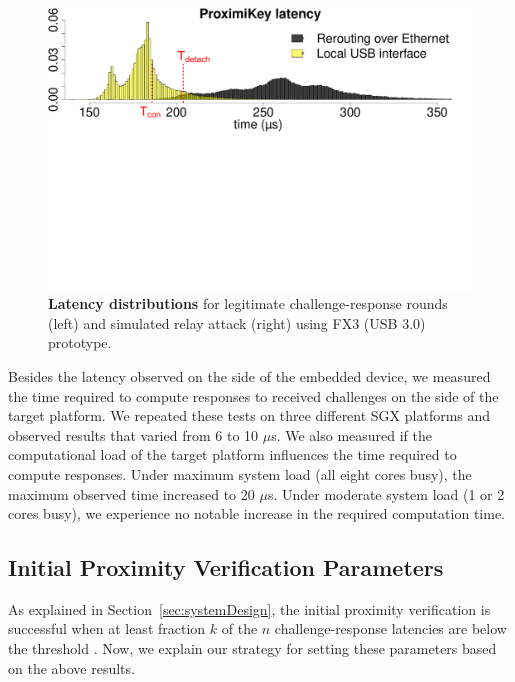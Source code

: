 \begin{figure}[t]
  \centering
    \includegraphics[trim={0 13.4cm 0 0},
    clip,width=\linewidth]{chapters/ProximiTEE/figures/histo.pdf} 
    \caption[Latency distributions]{\textbf{Latency distributions} for legitimate challenge-response rounds (left) and simulated relay attack (right) using FX3 (USB 3.0) prototype.}
    \label{graph:instatAttackerHisto}
\end{figure}



Besides the latency observed on the side of the embedded device, we measured the time required to compute responses to received challenges on the side of the target platform. We repeated these tests on three different SGX platforms and observed results that varied from 6 to 10 $\mu$s. We also measured if the computational load of the target platform influences the time required to compute responses. Under maximum system load (all eight cores busy), the maximum observed time increased to 20 $\mu$s. Under moderate system load (1 or 2 cores busy), we experience no notable increase in the required computation time. 


\subsection{Initial Proximity Verification Parameters}
\label{sec:evaluation:parameters}

As explained in Section~\ref{sec:systemDesign}, the initial proximity verification is successful when at least fraction $k$ of the $n$ challenge-response latencies are below the threshold \connect.  Now, we explain our strategy for setting these parameters based on the above results.

